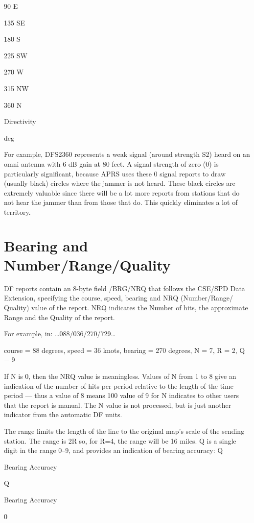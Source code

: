 90
E

135
SE

180
S

225
SW

270
W

315
NW

360
N

Directivity

deg

For example, DFS2360 represents a weak signal (around strength S2) heard
on an omni antenna with 6 dB gain at 80 feet.
A signal strength of zero (0) is particularly significant, because APRS uses
these 0 signal reports to draw (usually black) circles where the jammer is not
heard. These black circles are extremely valuable since there will be a lot
more reports from stations that do not hear the jammer than from those that
do. This quickly eliminates a lot of territory.

\section {Bearing and Number/Range/Quality}

DF reports contain an 8-byte field /BRG/NRQ that follows the CSE/SPD Data
Extension, specifying the course, speed, bearing and NRQ (Number/Range/
Quality) value of the report. NRQ indicates the Number of hits, the
approximate Range and the Quality of the report.

For example, in:
…088/036/270/729…

course = 88 degrees, speed = 36 knots,
bearing = 270 degrees, N = 7, R = 2, Q = 9

If N is 0, then the NRQ value is meaningless. Values of N from 1 to 8 give an
indication of the number of hits per period relative to the length of the time
period — thus a value of 8 means 100%
value of 9 for N indicates to other users that the report is manual.
The N value is not processed, but is just another indicator from the automatic
DF units.

The range limits the length of the line to the original map’s scale of the
sending station. The range is 2R so, for R=4, the range will be 16 miles.
Q is a single digit in the range 0–9, and provides an indication of bearing
accuracy:
Q

Bearing Accuracy

Q

Bearing Accuracy

0

